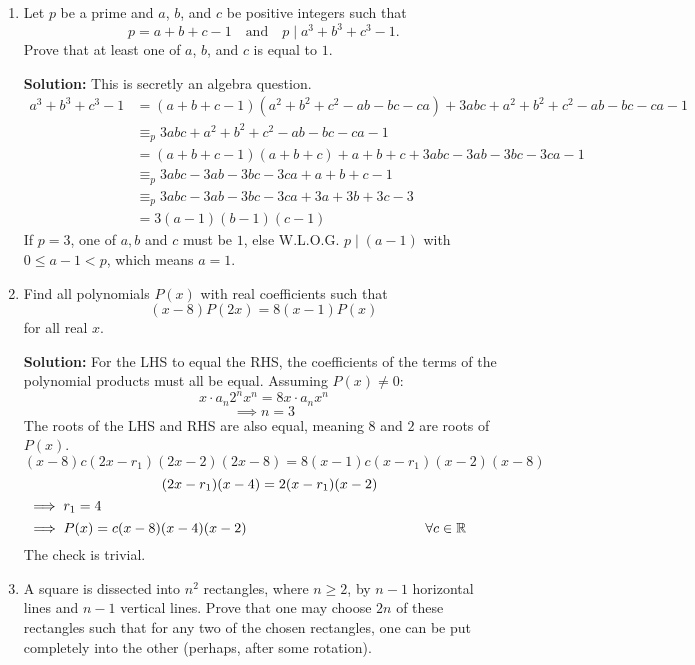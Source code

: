\documentclass{article}
\begin{document}
\begin{enumerate}[itemsep=\fill]
\item %
Let $p$ be a prime and $a$, $b$, and $c$ be positive integers such that
\[ p = a+b+c-1 \quad \text{and} \quad p \mid a^3+b^3+c^3-1. \]
Prove that at least one of $a$, $b$, and $c$ is equal to $1$.

\textbf{Solution: } This is secretly an algebra question.
\begin{align*}
a^3+b^3+c^3-1 &= (a+b+c-1)(a^2+b^2+c^2-ab-bc-ca)+3abc+a^2+b^2+c^2-ab-bc-ca-1\\
&\equiv_p 3abc+a^2+b^2+c^2-ab-bc-ca-1\\
&= (a+b+c-1)(a+b+c)+a+b+c+3abc-3ab-3bc-3ca-1\\
&\equiv_p 3abc-3ab-3bc-3ca+a+b+c-1\\
&\equiv_p 3abc-3ab-3bc-3ca+3a+3b+3c-3\\
&= 3(a-1)(b-1)(c-1)
\end{align*}
If $p=3$, one of $a,b$ and $c$ must be $1$, else W.L.O.G. $p \mid (a-1)$ with $0\leq a-1<p$, which means $a=1$. 

\item %
Find all polynomials $P(x)$ with real coefficients such that
\[ (x-8)P(2x) = 8(x-1)P(x) \]
for all real $x$.

\textbf{Solution:}
For the LHS to equal the RHS, the coefficients of the terms of the polynomial products must all be equal. Assuming $P(x) \neq 0$:
$$x \cdot a_n 2^nx^n = 8x\cdot a_n x^n$$
$$\implies n = 3$$
The roots of the LHS and RHS are also equal, meaning $8$ and $2$ are roots of $P(x)$.
$$(x-8)c(2x-r_1)(2x-2)(2x-8) = 8(x-1)c(x-r_1)(x-2)(x-8)$$
$$\hspace{3mm}(2x-r_1)(x-4) = 2(x-r_1)(x-2)$$
$$\implies r_1 = 4\hspace{100mm}$$
$$\implies P(x) = c(x-8)(x-4)(x-2) \hspace{45mm} \forall c\in\mathbb{R}\hspace{8mm}$$
The check is trivial.

\item %
A square is dissected into $n^2$ rectangles, where $n\geq 2$, by $n-1$ horizontal lines and $n-1$ vertical lines. Prove that one may choose $2n$ of these rectangles such that for any two of the chosen rectangles, one can be put completely into the other (perhaps, after some rotation).


\end{enumerate}
\end{document}
